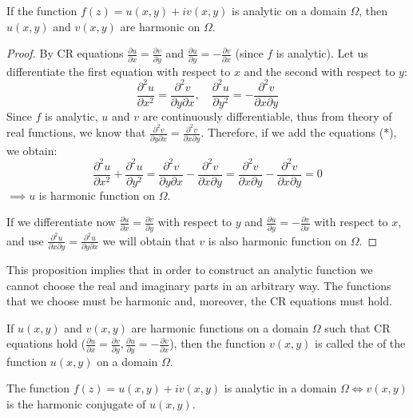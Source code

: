 \begin{proposition}\label{proposition:9.1} If the function $f(z) = u(x,y) + iv(x,y)$ is analytic on a domain $\Omega$, then $u(x,y)$ and $v(x,y)$ are harmonic on $\Omega$.
\end{proposition}

    \begin{proof}
By CR equations $\frac{\partial u}{\partial x} = \frac{\partial v}{\partial y}$ and $\frac{\partial u}{\partial y} = -\frac{\partial v}{\partial x}$ (since $f$ is analytic). Let us differentiate the first equation with respect to $x$ and the second with respect to $y$:
\[ \frac{\partial^2 u}{\partial x^2} = \frac{\partial^2 v}{\partial y \partial x}, \quad \frac{\partial^2 u}{\partial y^2} = -\frac{\partial^2 v}{\partial x \partial y} \]
Since $f$ is analytic, $u$ and $v$ are continuously differentiable, thus from theory of real functions, we know that $\frac{\partial^2 v}{\partial y \partial x} = \frac{\partial^2 v}{\partial x \partial y}$. Therefore, if we add the equations (*), we obtain:
\[ \frac{\partial^2 u}{\partial x^2} + \frac{\partial^2 u}{\partial y^2} = \frac{\partial^2 v}{\partial y \partial x} - \frac{\partial^2 v}{\partial x \partial y} = \frac{\partial^2 v}{\partial x \partial y} - \frac{\partial^2 v}{\partial x \partial y} = 0 \]
$\implies u$ is harmonic function on $\Omega$.

If we differentiate now $\frac{\partial u}{\partial x} = \frac{\partial v}{\partial y}$ with respect to $y$ and $\frac{\partial u}{\partial y} = -\frac{\partial v}{\partial x}$ with respect to $x$, and use $\frac{\partial^2 u}{\partial x \partial y} = \frac{\partial^2 u}{\partial y \partial x}$ we will obtain that $v$ is also harmonic function on $\Omega$.
    \end{proof}

This proposition implies that in order to construct an analytic function we cannot choose the real and imaginary parts in an arbitrary way. The functions that we choose must be harmonic and, moreover, the CR equations must hold.

\begin{definition}\label{definition:9.2} If $u(x,y)$ and $v(x,y)$ are harmonic functions on a domain $\Omega$ such that CR equations hold ($\frac{\partial u}{\partial x} = \frac{\partial v}{\partial y}, \frac{\partial u}{\partial y} = -\frac{\partial v}{\partial x}$), then the function $v(x,y)$ is called the  of the function $u(x,y)$ on a domain $\Omega$.
\end{definition}
\begin{proposition}\label{proposition:9.2} The function $f(z) = u(x,y) + iv(x,y)$ is analytic in a domain $\Omega \iff v(x,y)$ is the harmonic conjugate of $u(x,y)$.
\end{proposition}

